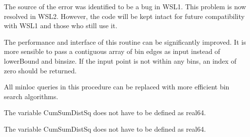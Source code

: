 \begin{DoxyRefList}
 The source of the error was identified to be a bug in WSL1. This problem is now resolved in WSL2. However, the code will be kept intact for future compatibility with WSL1 and those who still use it. 
\item[Subprogram \mbox{\hyperlink{namespaceHistogram__mod_ad80a9c34cbdd54d1c6b5d652c4def668}{Histogram\+\_\+mod\+::get\+Bin}} (x, lower\+Bound, nbin, binsize)]\label{todo__todo000030}%
%
 The performance and interface of this routine can be significantly improved. It is more sensible to pass a contiguous array of bin edges as input instead of {\ttfamily lower\+Bound} and {\ttfamily binsize}. If the input point is not within any bins, an index of zero should be returned. 
\item[Subprogram \mbox{\hyperlink{namespaceKmeans__mod_ac4b9beeaf1a19b79cfd5aacb8915fb02}{Kmeans\+\_\+mod\+::run\+KPP}} (nc, nd, np, Point, Sum\+Point, Membership, Size, potential)]\label{todo__todo000031}%
%
 All {\ttfamily minloc} queries in this procedure can be replaced with more efficient bin search algorithms.

\label{todo__todo000032}%
%
 The variable {\ttfamily Cum\+Sum\+Dist\+Sq} does not have to be defined as {\ttfamily real64}. 
\item[Subprogram \mbox{\hyperlink{namespaceKmeansOOP__mod_af12decb1817c7b3691239edf3ef79eff}{Kmeans\+OOP\+\_\+mod\+::run\+KPP}} (nc, nd, np, Point, Sum\+Point, Membership, Size, potential)]\label{todo__todo000034}%
%
 The variable {\ttfamily Cum\+Sum\+Dist\+Sq} does not have to be defined as {\ttfamily real64}.


\end{DoxyRefList}
